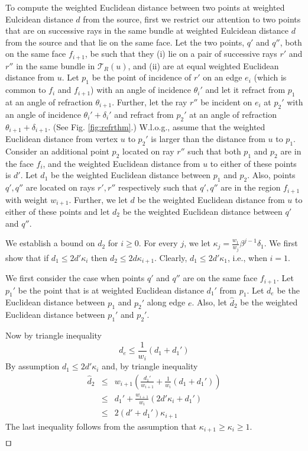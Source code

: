 \documentclass[11pt]{article}
\def\qed{\hbox{\rlap{$\sqcap$}$\sqcup$}}
\def\calT{\mathcal{T}}
\newenvironment{proof}{\par\noindent{\bf Proof:}}{\mbox{}\hfill$\qed$\\}
\begin{document}
\begin{proof}
To compute the weighted Euclidean distance between two points at weighted Eulcidean distance $d$ from the source, first we restrict our attention to two points that are on successive rays in the same bundle at weighted Eulcidean distance $d$ from the source and that lie on the same face. 
Let the two points, $q'$ and $q''$, both on the same face $f_{i+1}$, be such that they
(i) lie on a pair of successive rays $r'$ and $r''$ in the same bundle in $\calT_R(u)$, and (ii) are at equal weighted Euclidean distance from  $u$.
Let $p_1$ be the point of incidence of $r'$ on an edge $e_i$ (which is common to $f_i$ and $f_{i+1}$) with an angle of incidence $\theta_i'$ and let it refract from $p_1$ at an angle of refraction $\theta_{i+1}$. 
Further, let the ray $r''$ be incident on $e_i$ at $p_2'$ with an angle of incidence $\theta_i'+\delta_i'$ and refract from $p_2'$ at an angle of refraction $\theta_{i+1}+\delta_{i+1}$. 
(See Fig. \ref{fig:refrthm}.)
W.l.o.g., assume that the weighted Euclidean distance from vertex $u$ to $p_2'$ is larger than the distance from $u$ to $p_1$. 
Consider an additional point $p_2$ located on ray $r''$ such that both $p_1$ and $p_2$ are in the face $f_i$, and the weighted Euclidean distance from $u$ to either of these points is $d'$. 
Let $d_1$ be the weighted Euclidean distance between $p_1$ and $p_2$.
Also, points $q', q''$ are located on rays $r', r''$ respectively such that $q', q''$ are in the region $f_{i+1}$ with weight $w_{i+1}$.
Further, we let $d$ be the weighted Euclidean distance from $u$ to either of these points and let $d_2$ be the weighted Euclidean distance between $q'$ and $q''$.

We establish a bound on $d_2$ for $i \geq 0$.
For every $j$, we let $\kappa_j =  \frac{w_1}{w_j} \beta^{j-1} \delta_1$.
We first show that if $d_1 \le 2d' \kappa_i$ then $ d_2 \le 2d \kappa_{i+1}$. 
Clearly, $d_1 \leq 2d' \kappa_1$, i.e., when $i=1$.

We first consider the case when points $q'$ and $q''$ are on the same face $f_{i+1}$.
Let $p_1'$ be the point that is at weighted Euclidean distance $d_1'$ from $p_1$.
Let $d_e$ be the Euclidean distance between $p_1$ and $p_2'$ along edge $e$.
Also, let $\hat{d}_2$ be the weighted Euclidean distance between $p_1'$ and $p_2'$.

Now by triangle inequality
\[  d_e \leq \frac{1}{w_i} ( d_1 +d_1') \]
By assumption $d_1 \leq 2d' \kappa_i$ and, by triangle inequality
\begin{eqnarray*}
 \hat{d}_2  &\leq & w_{i+1} (\frac{d_1'}{w_{i+1}} +  \frac{1}{w_i} ( d_1 +d_1')) \\
 &\leq&  d_1' + \frac{w_{i+1}}{w_i}(2d' \kappa_i + d_1') \\
 & \leq& 2(d'+d_1') \kappa_{i+1}
\end{eqnarray*}
The last inequality follows from the assumption that $\kappa_{i+1} \geq \kappa_i \geq 1$.


\end{proof}
\end{document}
